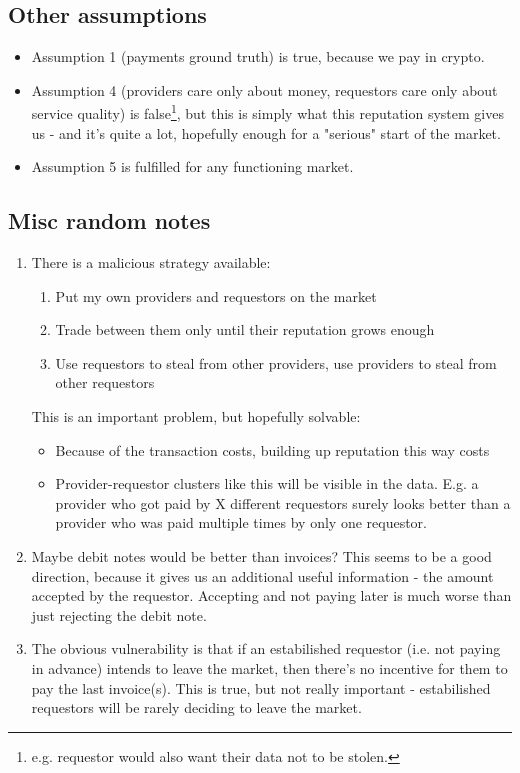 \documentclass{article}
\begin{document}
\subsection{Other assumptions}

\begin{itemize}

    \item Assumption 1 (payments ground truth) is true, because we pay in crypto.
    \item Assumption 4 (providers care only about money, requestors care only about service quality) is false\footnote{e.g. requestor would also want their data not to be stolen.}, but this is simply what this reputation system gives us - and it's quite a lot,
hopefully enough for a "serious" start of the market.
    \item Assumption 5 is fulfilled for any functioning market.
\end{itemize}

\subsection{Misc random notes}
\begin{enumerate}
    \item There is a malicious strategy available:
        \begin{enumerate}
            \item Put my own providers and requestors on the market
            \item Trade between them only until their reputation grows enough
            \item Use requestors to steal from other providers, use providers to steal from other requestors
        \end{enumerate}
        This is an important problem, but hopefully solvable:
        \begin{itemize}
            \item Because of the transaction costs, building up reputation this way costs
            \item Provider-requestor clusters like this will be visible in the data. E.g. a provider who got paid by X different requestors surely looks better than
                a provider who was paid multiple times by only one requestor.
        \end{itemize}
    \item Maybe debit notes would be better than invoices? This seems to be a good direction, because it gives us an additional useful information - 
        the amount accepted by the requestor. Accepting and not paying later is much worse than just rejecting the debit note.
    \item The obvious vulnerability is that if an estabilished requestor (i.e. not paying in advance) intends to leave the market, then there's no
        incentive for them to pay the last invoice(s). This is true, but not really important - estabilished requestors will be rarely deciding to leave the market.
\end{enumerate}
\end{document}
